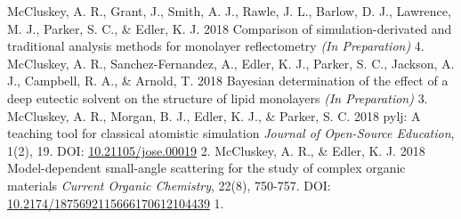 \begin{cvpubys}
  \cvpuby
    {McCluskey, A. R., Grant, J., Smith, A. J., Rawle, J. L., Barlow, D. J., Lawrence, M. J., Parker, S. C., \& Edler, K. J.}
    {2018}
    {Comparison of simulation-derivated and traditional analysis methods for monolayer reflectometry}
    {\emph{(In Preparation)}}
    {4.}
  \cvpuby
  	{McCluskey, A. R., Sanchez-Fernandez, A., Edler, K. J., Parker, S. C., Jackson, A. J., Campbell, R. A., \& Arnold, T.}
    {2018}
    {Bayesian determination of the effect of a deep eutectic solvent on the structure of lipid monolayers}
    {\emph{(In Preparation)}}
    {3.}
  \cvpuby
  	{McCluskey, A. R., Morgan, B. J., Edler, K. J., \& Parker, S. C.}
  	{2018}
  	{pylj: A teaching tool for classical atomistic simulation}
  	{\emph{Journal of Open-Source Education}, 1(2), 19. DOI: \href{http://doi.org/10.21105/jose.00019}{10.21105/jose.00019}}
  	{2.}
  \cvpuby
    {McCluskey, A. R., \& Edler, K. J.}
    {2018}
    {Model-dependent small-angle scattering for the study of complex organic materials}
	  {\emph{Current Organic Chemistry}, 22(8), 750-757. DOI: \href{http://doi.org/10.2174/1875692115666170612104439}{10.2174/1875692115666170612104439}}
    {1.}
\end{cvpubys}
